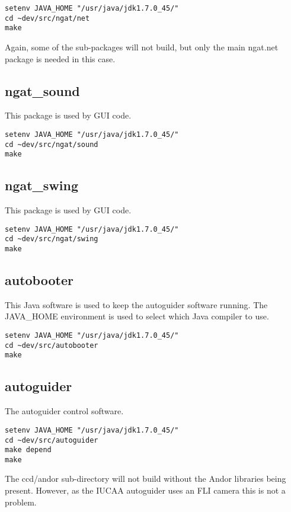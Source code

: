 \documentclass[10pt,a4paper]{article}
\begin{document}
\begin{verbatim}
setenv JAVA_HOME "/usr/java/jdk1.7.0_45/"
cd ~dev/src/ngat/net
make
\end{verbatim}

Again, some of the sub-packages will not build, but only the main ngat.net package is needed in this case.

\subsection{ngat\_sound}

This package is used by GUI code.

\begin{verbatim}
setenv JAVA_HOME "/usr/java/jdk1.7.0_45/"
cd ~dev/src/ngat/sound
make
\end{verbatim}

\subsection{ngat\_swing}

This package is used by GUI code.

\begin{verbatim}
setenv JAVA_HOME "/usr/java/jdk1.7.0_45/"
cd ~dev/src/ngat/swing
make
\end{verbatim}


\subsection{autobooter}

This Java software is used to keep the autoguider software running. The JAVA\_HOME environment is used to select
which Java compiler to use.

\begin{verbatim}
setenv JAVA_HOME "/usr/java/jdk1.7.0_45/"
cd ~dev/src/autobooter
make
\end{verbatim}

\subsection{autoguider}

The autoguider control software.

\begin{verbatim}
setenv JAVA_HOME "/usr/java/jdk1.7.0_45/"
cd ~dev/src/autoguider
make depend
make
\end{verbatim}

The ccd/andor sub-directory will not build without the Andor libraries being present. However, as the IUCAA autoguider
uses an FLI camera this is not a problem.

\begin{thebibliography}{99}

\end{thebibliography}
\end{document}
